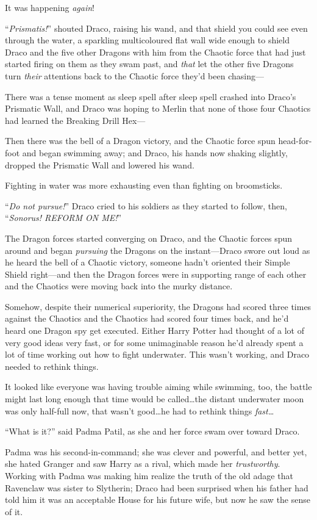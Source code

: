 It was happening \emph{again}!

“\emph{Prismatis!}” shouted Draco, raising his wand, and that shield you could see even through the water, a sparkling multicoloured flat wall wide enough to shield Draco and the five other Dragons with him from the Chaotic force that had just started firing on them as they swam past, and \emph{that} let the other five Dragons turn \emph{their} attentions back to the Chaotic force they’d been chasing—

There was a tense moment as sleep spell after sleep spell crashed into Draco’s Prismatic Wall, and Draco was hoping to Merlin that none of those four Chaotics had learned the Breaking Drill Hex—

Then there was the bell of a Dragon victory, and the Chaotic force spun head-for-foot and began swimming away; and Draco, his hands now shaking slightly, dropped the Prismatic Wall and lowered his wand.

Fighting in water was more exhausting even than fighting on broomsticks.

“\emph{Do not pursue!}” Draco cried to his soldiers as they started to follow, then, “\emph{Sonorus! REFORM ON ME!}”

The Dragon forces started converging on Draco, and the Chaotic forces spun around and began \emph{pursuing} the Dragons on the instant—Draco swore out loud as he heard the bell of a Chaotic victory, someone hadn’t oriented their Simple Shield right—and then the Dragon forces were in supporting range of each other and the Chaotics were moving back into the murky distance.

Somehow, despite their numerical superiority, the Dragons had scored three times against the Chaotics and the Chaotics had scored four times back, and he’d heard one Dragon spy get executed. Either Harry Potter had thought of a lot of very good ideas very fast, or for some unimaginable reason he’d already spent a lot of time working out how to fight underwater. This wasn’t working, and Draco needed to rethink things.

It looked like everyone was having trouble aiming while swimming, too, the battle might last long enough that time would be called…the distant underwater moon was only half-full now, that wasn’t good…he had to rethink things \emph{fast…}

“What is it?” said Padma Patil, as she and her force swam over toward Draco.

Padma was his second-in-command; she was clever and powerful, and better yet, she hated Granger and saw Harry as a rival, which made her \emph{trustworthy}. Working with Padma was making him realize the truth of the old adage that Ravenclaw was sister to Slytherin; Draco had been surprised when his father had told him it was an acceptable House for his future wife, but now he saw the sense of it.


